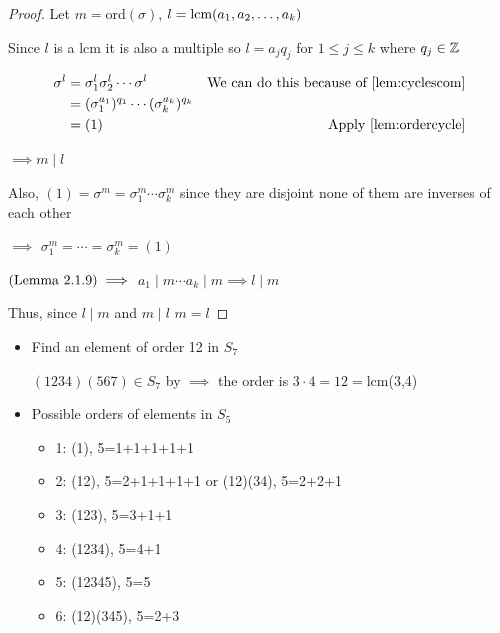 \begin{proof}
    Let \(m=\)ord\((\sigma)\), \(l=\text{lcm}(a_1,a_2,\dots,a_k)\)

    Since \(l\) is a lcm it is also a multiple so \(l=a_jq_j\) for \(1\leq j\leq k\) where \(q_j\in\mathbb{Z}\)
    
    \begin{align*}
        \sigma^l&=\sigma_1^l\sigma_2^l\cdots\sigma^l & \t{We can do this because of \Cref{lem:cyclescom}}\\
                &=(\sigma_1^{a_1})^{q_1}\cdots(\sigma_k^{a_k})^{q_k}\\
                &=(1) &\t{Apply \Cref{lem:ordercycle}}
    \end{align*}

    \(\implies m\mid l\)

    Also, \((1)=\sigma^m=\sigma_1^m\cdots\sigma_k^m\) since they are disjoint none of them are inverses of each other
    
    \(\implies\) \(\sigma_1^m=\cdots=\sigma_k^m=(1)\)

    \(\text{(Lemma 2.1.9)}\implies\) \(a_1\mid m \cdots a_k \mid m \implies l \mid m\)

    Thus, since \(l \mid m\) and \(m \mid l\) \(m=l\)
\end{proof}
\newpage
\begin{example}
    \phantom{text}

    \begin{itemize}
        \item Find an element of order 12 in \(S_7\)
        
        \((1234)(567)\in S_7\) by  \(\implies\) the order is \(3\cdot4=12=\)lcm(3,4)
        \item Possible orders of elements in \(S_5\)
        \begin{itemize}
            \item 1: (1), 5=1+1+1+1+1
            \item 2: (12), 5=2+1+1+1+1 or (12)(34), 5=2+2+1
            \item 3: (123), 5=3+1+1
            \item 4: (1234), 5=4+1
            \item 5: (12345), 5=5
            \item 6: (12)(345), 5=2+3
        \end{itemize}
    \end{itemize}
\end{example}

